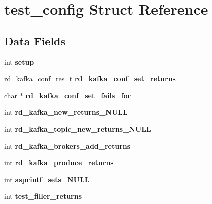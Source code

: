 \hypertarget{structtest__config}{\section{test\-\_\-config Struct Reference}
\label{structtest__config}
}
\subsection*{Data Fields}
\begin{DoxyCompactItemize}
\item 
\hypertarget{structtest__config_a3942b32032a000171742f126e13607d2}{int {\bfseries setup}}\label{structtest__config_a3942b32032a000171742f126e13607d2}

\item 
\hypertarget{structtest__config_a5874c7e35af748ee2da2dc2aad4ec903}{rd\-\_\-kafka\-\_\-conf\-\_\-res\-\_\-t {\bfseries rd\-\_\-kafka\-\_\-conf\-\_\-set\-\_\-returns}}\label{structtest__config_a5874c7e35af748ee2da2dc2aad4ec903}

\item 
\hypertarget{structtest__config_a13b45e925e2241e87ce751646f730be0}{char $\ast$ {\bfseries rd\-\_\-kafka\-\_\-conf\-\_\-set\-\_\-fails\-\_\-for}}\label{structtest__config_a13b45e925e2241e87ce751646f730be0}

\item 
\hypertarget{structtest__config_a0e09841bad2767e40180e1779db2d58c}{int {\bfseries rd\-\_\-kafka\-\_\-new\-\_\-returns\-\_\-\-N\-U\-L\-L}}\label{structtest__config_a0e09841bad2767e40180e1779db2d58c}

\item 
\hypertarget{structtest__config_aadee747b7f4c1523707dc80ced66c06a}{int {\bfseries rd\-\_\-kafka\-\_\-topic\-\_\-new\-\_\-returns\-\_\-\-N\-U\-L\-L}}\label{structtest__config_aadee747b7f4c1523707dc80ced66c06a}

\item 
\hypertarget{structtest__config_a6e20e3761d982cf3804eb7be5149a2b5}{int {\bfseries rd\-\_\-kafka\-\_\-brokers\-\_\-add\-\_\-returns}}\label{structtest__config_a6e20e3761d982cf3804eb7be5149a2b5}

\item 
\hypertarget{structtest__config_a6f7d96df9bfb99390aa635464437df3e}{int {\bfseries rd\-\_\-kafka\-\_\-produce\-\_\-returns}}\label{structtest__config_a6f7d96df9bfb99390aa635464437df3e}

\item 
\hypertarget{structtest__config_a211d0bc30b66785619572f2ad06dd9f3}{int {\bfseries asprintf\-\_\-sets\-\_\-\-N\-U\-L\-L}}\label{structtest__config_a211d0bc30b66785619572f2ad06dd9f3}

\item 
\hypertarget{structtest__config_a09f566e91c7300bbe40e9125a8a6cbfb}{int {\bfseries test\-\_\-filler\-\_\-returns}}\label{structtest__config_a09f566e91c7300bbe40e9125a8a6cbfb}

\end{DoxyCompactItemize}


